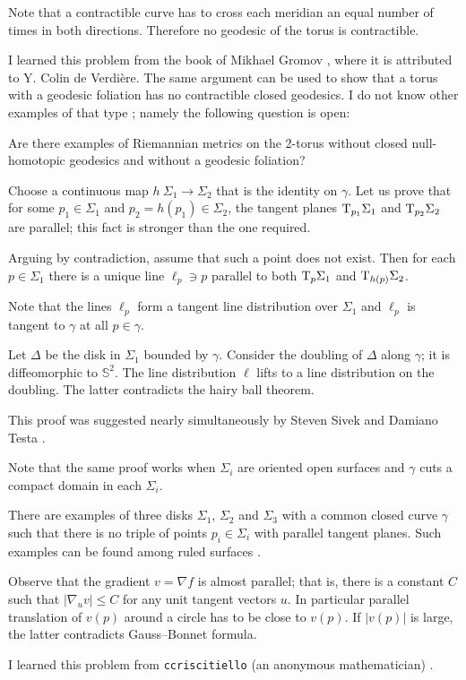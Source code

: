 Note that a contractible curve has to cross each meridian an equal number of times in both directions.
Therefore no geodesic of the torus is contractible.\qeds 


I learned this problem 
from the book of Mikhael Gromov \cite{gromov-MetStr},
where it is attributed to Y. Colin de Verdi\`ere.
The same argument can be used to show that a torus with a geodesic foliation has no contractible closed geodesics.
I do not know other examples of that type \cite{petrunin-torus}; namely the following question is open:

\begin{pr}
Are there examples of Riemannian metrics on the 2-torus without closed null-homotopic geodesics and without a geodesic foliation?
\end{pr}


Choose a continuous map $h\:\Sigma_1\to \Sigma_2$
that is the identity on $\gamma$.
Let us prove that for some $p_1\in \Sigma_1$ and $p_2=h(p_1)\in \Sigma_2$,
the tangent planes $\mathrm{T}_{p_1} \Sigma_1$ and  $\mathrm{T}_{p_2} \Sigma_2$ are parallel;
this fact is stronger than the one required.

\medskip

Arguing by contradiction,
assume that such a point does not exist.
Then for each $p\in\Sigma_1$
there is a unique line $\ell_p\ni p$ 
 parallel to both $\mathrm{T}_{p} \Sigma_1$ and $\mathrm{T}_{h(p)} \Sigma_2$.

Note that the lines $\ell_p$ form a tangent line distribution over $\Sigma_1$
and $\ell_p$ is tangent to $\gamma$ at all $p\in\gamma$.

Let $\Delta$ be the disk in $\Sigma_1$ bounded by $\gamma$.
Consider the doubling of $\Delta$ along  $\gamma$;
it is diffeomorphic to $\mathbb S^2$.
The line distribution $\ell$ lifts to a line distribution on the doubling.
The latter contradicts the hairy ball theorem.\qeds


This proof was suggested nearly simultaneously 
by Steven Sivek 
and Damiano Testa \cite{two-disks}.

Note that the same proof works when $\Sigma_i$ are oriented open surfaces and $\gamma$ cuts a compact domain in each $\Sigma_i$.

There are examples of three disks $\Sigma_1$, $\Sigma_2$ and $\Sigma_3$
with a common closed curve $\gamma$ such that there is
no triple of points $p_i\in\Sigma_i$ with parallel tangent planes.
Such examples can be found among ruled surfaces \cite{three-disks}.

Observe that the gradient $v=\nabla f$ is almost parallel;
that is, there is a constant $C$ such that $|\nabla_u v|\le C$ for any unit tangent vectors $u$.
In particular parallel translation of $v(p)$ around a circle has to be close to $v(p)$.
If $|v(p)|$ is large, the latter contradicts Gauss--Bonnet formula.

\medskip

I learned this problem from \texttt{ccriscitiello} (an anonymous mathematician) \cite{ccriscitiello}.
